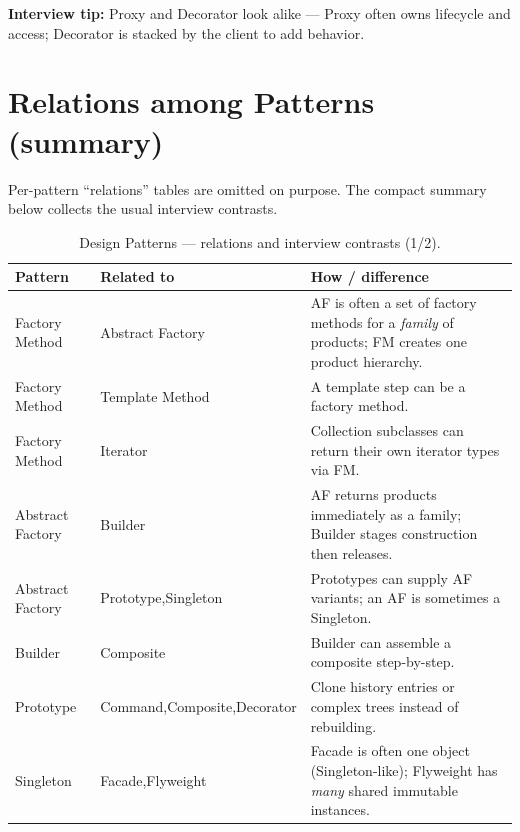 \par\noindent\textbf{Interview tip:} Proxy and Decorator look alike ---
Proxy often owns lifecycle and access; Decorator is stacked by the client
to add behavior.

\newpage
\section{Relations among Patterns (summary)}
\label{sec:pattern-relations}
Per-pattern ``relations'' tables are omitted on purpose. The compact summary below
collects the usual interview contrasts.

\begin{table}[H]
    \setlength{\tabcolsep}{4pt}
    \begin{tabularx}{\textwidth}{%
        |>{\raggedright\arraybackslash}p{}%
        |>{\raggedright\arraybackslash}p{}%
        |X|}
        \hline
        \textbf{Pattern} & \textbf{Related to} & \textbf{How / difference} \\
        \hline
        Factory Method & Abstract Factory & AF is often a set of factory methods for a \emph{family} of products; FM creates one product hierarchy. \\
        \hline
        Factory Method & Template Method & A template step can be a factory method. \\
        \hline
        Factory Method & Iterator & Collection subclasses can return their own iterator types via FM. \\
        \hline
        Abstract Factory & Builder & AF returns products immediately as a family; Builder stages construction then releases. \\
        \hline
        Abstract Factory & Prototype,\newline Singleton &
        Prototypes can supply AF variants; an AF is sometimes a Singleton. \\
        \hline
        Builder & Composite & Builder can assemble a composite step-by-step. \\
        \hline
        Prototype & Command,\newline Composite,\newline Decorator &
        Clone history entries or complex trees instead of rebuilding. \\
        \hline
        Singleton & Facade,\newline Flyweight &
        Facade is often one object (Singleton-like); Flyweight has \emph{many} shared immutable instances. \\
        \hline
    \end{tabularx}
    \caption{Design Patterns --- relations and interview contrasts (1/2).}
    \label{tab:pattern-relations-summary}
\end{table}

